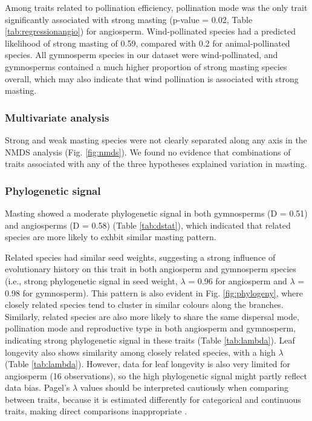 \documentclass{article}
\begin{document}
Among traits related to pollination efficiency, pollination mode was the only trait significantly associated with strong masting (p-value = 0.02, Table \ref{tab:regressionangio}) for angiosperm. Wind-pollinated species had a predicted likelihood of strong masting of 0.59, compared with 0.2 for animal-pollinated species. All gymnosperm species in our dataset were wind-pollinated, and gymnosperms contained a much higher proportion of strong masting species overall, which may also indicate that wind pollination is associated with strong masting.
\subsubsection{Multivariate analysis}
Strong and weak masting species were not clearly separated along any axis in the NMDS analysis (Fig. \ref{fig:nmds}). We found no evidence that combinations of traits associated with any of the three hypotheses explained variation in masting.
\subsubsection{Phylogenetic signal}
Masting showed a moderate phylogenetic signal in both gymnosperms (D = 0.51) and angiosperms (D = 0.58) (Table \ref{tab:dstat}), which indicated that related species are more likely to exhbit similar masting pattern.

Related species had similar seed weights, suggesting a strong influence of evolutionary history on this trait in both angiosperm and gymnosperm species (i.e., strong phylogenetic signal in seed weight, $\lambda$ = 0.96 for angiosperm and $\lambda$ = 0.98 for gymnosperm). This pattern is also evident in Fig. \ref{fig:phylogeny}, where closely related species tend to cluster in similar colours along the branches. Similarly, related species are also more likely to share the same dispersal mode, pollination mode and reproductive type in both angiosperm and gymnosperm, indicating strong phylogenetic signal in these traits (Table \ref{tab:lambda}). Leaf longevity also shows similarity among closely related species, with a high $\lambda$ (Table \ref{tab:lambda}). However, data for leaf longevity is also very limited for angiosperm (16 observations), so the high phylogenetic signal might partly reflect data bias. Pagel's $\lambda$ values should be interpreted cautiously when comparing between traits, because it is estimated differently for categorical and continuous traits, making direct comparisons inappropriate \citep{yang2006computational}.
\end{document}
